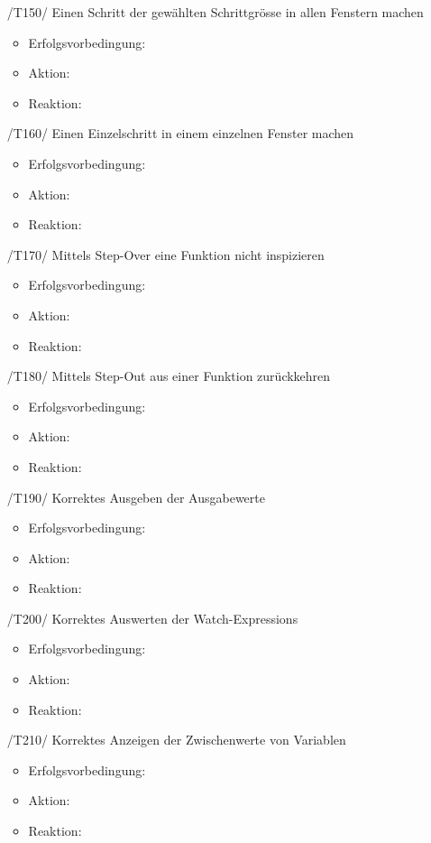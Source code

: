 \documentclass[parskip=full]{scrartcl}
\begin{document}
\begin{itemize}
	\item[/T150/] Einen \gls{Schritt} der gewählten \gls{Schrittgrösse} in allen Fenstern machen
		\begin{itemize}
		\item Erfolgsvorbedingung:
		\item Aktion:
		\item Reaktion:		
		\end{itemize}	
	
	\item[/T160/] Einen \gls{Einzelschritt} in einem einzelnen Fenster machen
		\begin{itemize}
		\item Erfolgsvorbedingung:
		\item Aktion:
		\item Reaktion:		
		\end{itemize}	
	
	\item[/T170/] Mittels \gls{Step-Over} eine Funktion nicht inspizieren
		\begin{itemize}
		\item Erfolgsvorbedingung:
		\item Aktion:
		\item Reaktion:		
		\end{itemize}	
	
	\item[/T180/] Mittels \gls{Step-Out} aus einer Funktion zurückkehren
		\begin{itemize}
		\item Erfolgsvorbedingung:
		\item Aktion:
		\item Reaktion:		
		\end{itemize}	
	
	\item[/T190/] Korrektes Ausgeben der Ausgabewerte
		\begin{itemize}
		\item Erfolgsvorbedingung:
		\item Aktion:
		\item Reaktion:		
		\end{itemize}	
	
	\item[/T200/] Korrektes Auswerten der \glspl{Watch-Expression}
		\begin{itemize}
		\item Erfolgsvorbedingung:
		\item Aktion:
		\item Reaktion:		
		\end{itemize}	
	
	\item[/T210/] Korrektes Anzeigen der Zwischenwerte von Variablen
		\begin{itemize}
		\item Erfolgsvorbedingung:
		\item Aktion:
		\item Reaktion:		
		\end{itemize}	
	
	
\end{itemize}
\end{document}
